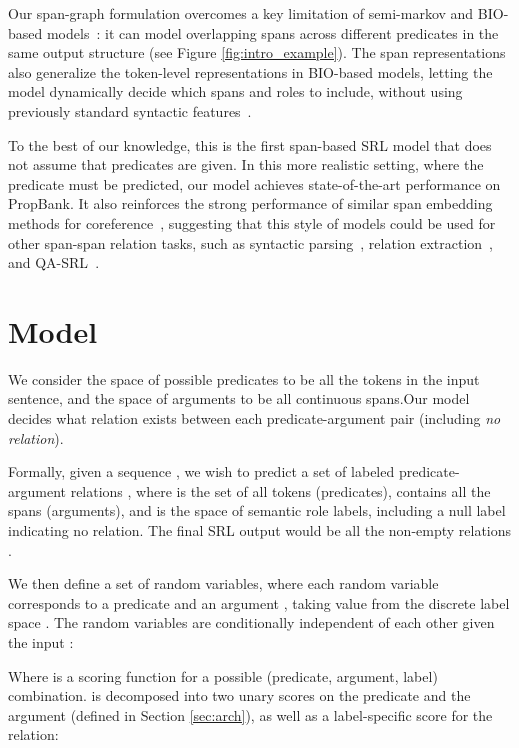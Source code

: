 \documentclass[11pt,a4paper]{article}
\begin{document}
Our span-graph formulation overcomes a key limitation of semi-markov and BIO-based models~\cite{kong2015segmental,zhou2015end,Yang2017AJS,He2017DeepSR,tan2018deep}: it can model overlapping spans across different predicates in the same output structure (see Figure \ref{fig:intro_example}).
The span representations also generalize the token-level representations in BIO-based models, letting the model dynamically decide which spans and roles to include, without using previously standard syntactic features~\cite{punyakanok2008importance,fitzgerald2015semantic}. 

To the best of our knowledge, this is the first span-based SRL model that does not assume that predicates are given. In this more realistic setting, where the predicate must be predicted, our model achieves state-of-the-art performance on PropBank.
It also reinforces the strong performance of similar span embedding methods for coreference~\cite{Lee2017EndtoendNC}, suggesting that this style of models could be used for other span-span relation tasks, 
such as syntactic parsing~\cite{stern2017minimal},
relation extraction~\cite{miwa2016end}, and QA-SRL~\cite{fitzgerald2018large}.
 

\section{Model}\label{sec:model}

We consider the space of possible predicates to be all the tokens in the input sentence, and the space of arguments to be all continuous spans.Our model decides what relation exists between each predicate-argument pair (including \textit{no relation}).

Formally, given a sequence , we wish to predict a set of labeled predicate-argument relations ,
where  is the set of all tokens (predicates),  contains all the spans (arguments), and  is the space of semantic role labels, including a null label  indicating no relation. The final SRL output would be all the non-empty relations .


We then define a set of random variables, where each random variable  corresponds to a predicate  and an argument , 
taking value from the discrete label space . The random variables  are conditionally independent of each other given the input :

Where  is a scoring function for a possible (predicate, argument, label) combination.
 is decomposed into two unary scores on the predicate and the argument (defined in  Section \ref{sec:arch}), as well as a label-specific score for the relation:
\end{document}
